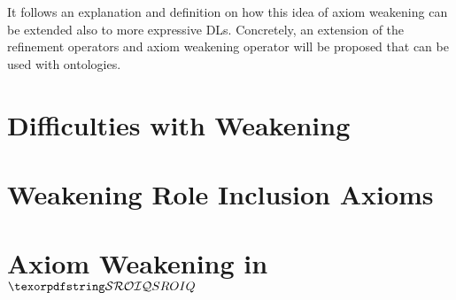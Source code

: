 
It follows an explanation and definition on how this idea of axiom weakening can be extended also to more expressive DLs. Concretely, an extension of the refinement operators and axiom weakening operator will be proposed that can be used with \SROIQ ontologies.

\section{Difficulties with Weakening \SROIQ} \label{expressivity-problems}



\section{Weakening Role Inclusion Axioms} \label{rbox-weakening}



\section{Axiom Weakening in \texorpdfstring{$\SROIQ$}{SROIQ}} \label{weakening-sroiq}


